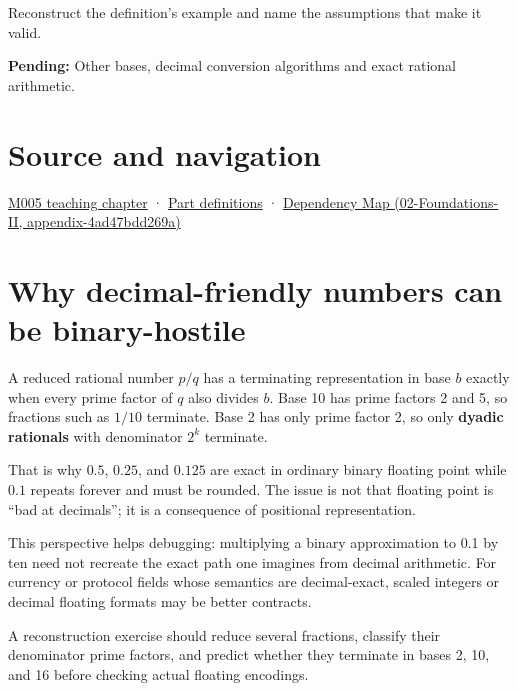 Reconstruct the definition's example and name the assumptions that make it valid.

\textbf{Pending:} Other bases, decimal conversion algorithms and exact rational arithmetic.

\section{Source and navigation}\label{appendix-2a2f1b74bdd3-source-and-navigation}

\href{Continuous\%20Notes/Computing\%20Foundations\%20-\%20From\%20Bits\%20to\%20C++\%20and\%20Systems\%20APIs\#When\%20arithmetic\%20meets\%20uncertainty}{M005 teaching chapter} · \hyperref[appendix-fd090d982a15-m005---parts-77-88]{Part definitions} · \href{../02-Foundations-II/main.pdf\#nameddest=appendix-4ad47bdd269a}{Dependency Map (02-Foundations-II, appendix-4ad47bdd269a)}

\section{Why decimal-friendly numbers can be binary-hostile}\label{appendix-2a2f1b74bdd3-why-decimal-friendly-numbers-can-be-binary-hostile}

A reduced rational number \(p/q\) has a terminating representation in base \(b\) exactly when every prime factor of \(q\) also divides \(b\). Base 10 has prime factors 2 and 5, so fractions such as \(1/10\) terminate. Base 2 has only prime factor 2, so only \textbf{dyadic rationals} with denominator \(2^k\) terminate.

That is why \(0.5\), \(0.25\), and \(0.125\) are exact in ordinary binary floating point while \(0.1\) repeats forever and must be rounded. The issue is not that floating point is ``bad at decimals''; it is a consequence of positional representation.

This perspective helps debugging: multiplying a binary approximation to 0.1 by ten need not recreate the exact path one imagines from decimal arithmetic. For currency or protocol fields whose semantics are decimal-exact, scaled integers or decimal floating formats may be better contracts.

A reconstruction exercise should reduce several fractions, classify their denominator prime factors, and predict whether they terminate in bases 2, 10, and 16 before checking actual floating encodings.
